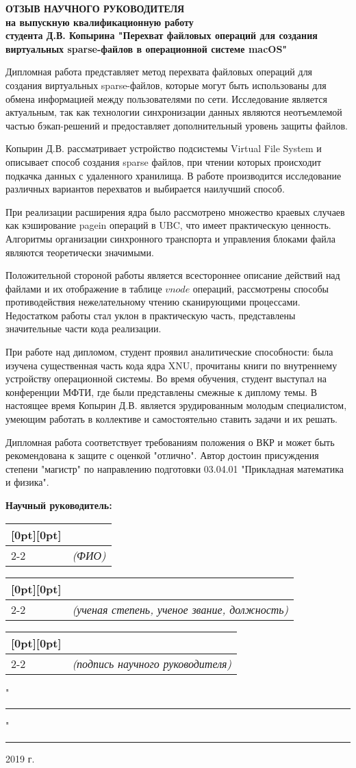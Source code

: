 \documentclass[12pt, a4paper]{article}
\newcommand{\signature}[2][20em]{%
  \hspace{-8em}
  \begin{tabular}[t]{ p{#1} p{#1} }
    \raisebox{-.5ex}[0pt][0pt]{\bfseries } & \\
    \cline{2-2}
    & \centering\scriptsize\itshape (#2)
  \end{tabular}
}
\begin{document}
\setlength{\parskip}{1.3em}
\begin{center}
\textbf{ОТЗЫВ НАУЧНОГО РУКОВОДИТЕЛЯ} \\
\textbf{на выпускную квалификационную работу} \\
\textbf{студента Д.В. Копырина "Перехват файловых операций для создания виртуальных sparse-файлов в операционной системе macOS"}
\end{center}

\setlength{\parskip}{0.5em}
Дипломная работа представляет метод перехвата файловых операций для создания виртуальных sparse-файлов, которые могут быть использованы для обмена информацией между пользователями по сети. Исследование является актуальным, так как технологии синхронизации данных являются неотъемлемой частью бэкап-решений и предоставляет дополнительный уровень защиты файлов.

Копырин Д.В. рассматривает устройство подсистемы Virtual File System и описывает способ создания sparse файлов, при чтении которых происходит подкачка данных с удаленного хранилища. В работе производится исследование различных вариантов перехватов и выбирается наилучший способ.

При реализации расширения ядра было рассмотрено множество краевых случаев как кэширование pagein операций в UBC, что имеет практическую ценность. Алгоритмы организации синхронного транспорта и управления блоками файла являются теоретически значимыми.

Положительной стороной работы является всестороннее описание действий над файлами и их отображение в таблице $vnode$ операций, рассмотрены способы противодействия нежелательному чтению сканирующими процессами. Недостатком работы стал уклон в практическую часть, представлены значительные части кода реализации.

При работе над дипломом, студент проявил аналитические способности: была изучена существенная часть кода ядра XNU, прочитаны книги по внутреннему устройству операционной системы. Во время обучения, студент выступал на конференции МФТИ, где были представлены смежные к диплому темы. В настоящее время Копырин Д.В. является эрудированным молодым специалистом, умеющим работать в коллективе и самостоятельно ставить задачи и их решать. 

Дипломная работа соответствует требованиям положения о ВКР и может быть рекомендована к защите с оценкой "отлично". Автор достоин присуждения степени "магистр" по направлению подготовки 03.04.01 "Прикладная математика и физика".

\setlength{\parskip}{1.2em}
\hfill \textbf{Научный руководитель:} \hspace{8.5em}

\signature{ФИО}

\signature{ученая степень, ученое звание, должность}

\signature{подпись научного руководителя}

\hfill "\rule{20pt}{1pt}" \rule{90pt}{1pt} 2019 г.
\end{document}
